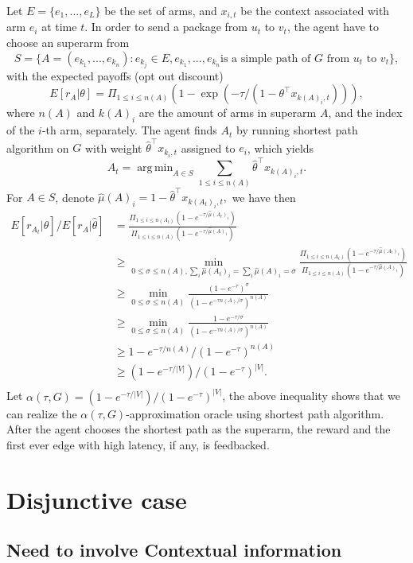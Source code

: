 \documentclass[a4paper,11pt]{article}
\DeclareMathOperator*{\argmin}{arg\,min}
\begin{document}
Let $E=\{e_1,...,e_L\}$ be the set of arms, and $x_{i,t}$ be the context associated with arm $e_i$ at time $t$.
In order to send a package from $u_t$ to $v_t$,
the agent have to choose an superarm from $$S=\{A=(e_{k_1},...,e_{k_n}):e_{k_j}\in E, e_{k_1},...,e_{k_n} \text{is a simple path of } G \text{ from } u_t \text{ to } v_t\},$$
with the expected payoffs (opt out discount) $$E[r_A|\theta]=\Pi_{1\leq i\leq n(A)}(1-\exp(-\tau/(1-\theta^{\top}x_{k(A)_i,t}))),$$
where $n(A)$ and $k(A)_i$ are the amount of arms in superarm $A$, and the index of the $i$-th arm, separately.
The agent finds $A_t$ by running shortest path algorithm on $G$ with weight $\hat{\theta}^{\top}x_{k_i,t}$ assigned to $e_i$, which yields $$A_t=\argmin_{A\in S}\sum_{1\leq i\leq n(A)}\hat{\theta}^{\top}x_{k(A)_i,t}.$$
For $A\in S$, denote $\hat{\mu}(A)_i=1-\hat{\theta}^{\top}x_{k(A_t)_i,t},$ we have then 
\begin{align*}
  E[r_{A_t}|\hat{\theta}]/E[r_A|\hat{\theta}] &= \frac{\Pi_{1\leq i\leq n(A_t)}(1-e^{-\tau/\hat{\mu}(A_t)_i})}{\Pi_{1\leq i\leq n(A)}(1-e^{-\tau/\hat{\mu}(A)_i})}\\
  &\geq \min_{0\leq \sigma \leq n(A), \sum_i \hat{\mu}(A_t)_i=\sum_i \hat{\mu}(A)_i=\sigma}\frac{\Pi_{1\leq i\leq n(A_t)}(1-e^{-\tau/\hat{\mu}(A_t)_i})}{\Pi_{1\leq i\leq n(A)}(1-e^{-\tau/\hat{\mu}(A)_i})}\\
  &\geq \min_{0\leq \sigma \leq n(A)}\frac{(1-e^{-\tau})^\sigma}{(1-e^{-\tau n(A)/\sigma})^{n(A)}}\\
  &\geq \min_{0\leq \sigma \leq n(A)}\frac{1-e^{-\tau/\sigma}}{(1-e^{-\tau n(A)/\sigma})^{n(A)}}\\
  &\geq 1-e^{-\tau/n(A)}/(1-e^{-\tau})^{n(A)}\\
  &\geq (1-e^{-\tau/|V|})/(1-e^{-\tau})^{|V|}.\\
\end{align*}
Let $\alpha(\tau, G)=(1-e^{-\tau/|V|})/(1-e^{-\tau})^{|V|}$, the above inequality shows that we can realize the $\alpha(\tau, G)$-approximation oracle using shortest path algorithm.
After the agent chooses the shortest path as the superarm, the reward and the first ever edge with high latency, if any, is feedbacked.

\section{Disjunctive case}

\subsection{Need to involve Contextual information}
\end{document}
